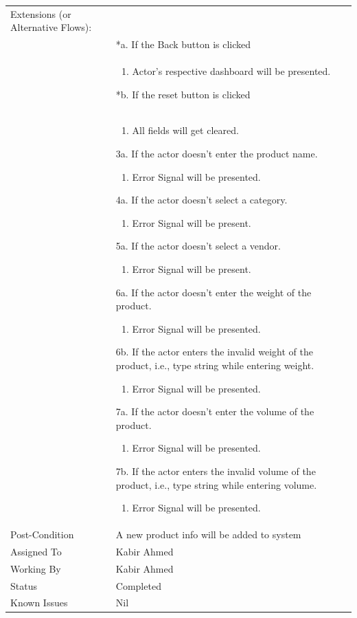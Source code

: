 \documentclass[12pt,a4paper]{article}
\begin{document}
\begin{longtable}{| p{3cm}|p{12cm}|}
Extensions (or Alternative Flows):\\
& *a. If the Back button is clicked \\
& \begin{enumerate}
		\item Actor's respective dashboard will be presented.
	\end{enumerate}
*b. If the reset button is clicked \\
&	\begin{enumerate}
		\item All fields will get cleared.
	\end{enumerate}
3a. If the actor doesn't enter the product name.
 	\begin{enumerate}
		\item Error Signal will be presented.
	\end{enumerate}
4a. If the actor doesn't select a category.
 	\begin{enumerate}
		\item Error Signal will be present.
	\end{enumerate}

5a. If the actor doesn't select a vendor.
 	\begin{enumerate}
		\item Error Signal will be present.
	\end{enumerate}

6a. If the actor doesn't enter the weight of the product.
 	\begin{enumerate}
		\item Error Signal will be presented.
	\end{enumerate}
6b. If the actor enters the invalid weight of the product, i.e., type string while entering weight.
 	\begin{enumerate}
		\item Error Signal will be presented.
	\end{enumerate}
7a. If the actor doesn't enter the volume of the product.
 	\begin{enumerate}
		\item Error Signal will be presented.
	\end{enumerate}
7b. If the actor enters the invalid volume of the product, i.e., type string while entering volume.
 	\begin{enumerate}
		\item Error Signal will be presented.
	\end{enumerate}
\\ \hline
Post-Condition &    A new product info will be added to system\\ \hline
Assigned To &  Kabir Ahmed
\\ \hline
Working By &   Kabir Ahmed
\\ \hline
Status & 	Completed	
\\ \hline
Known Issues & Nil
\\\hline
\end{longtable}
\end{document}
